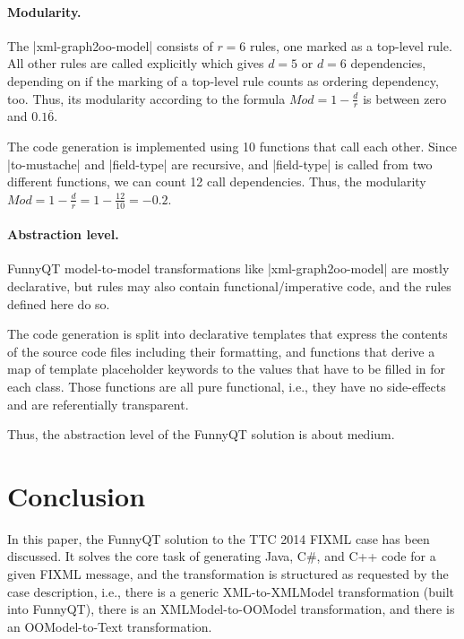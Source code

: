 \documentclass[submission]{eptcs}
\newcommand{\code}{\clojureinline}
\begin{document}
\paragraph{Modularity.}
\label{sec:modularity}

The \code|xml-graph2oo-model| consists of \(r=6\)
rules, one marked as a top-level rule.  All other rules are called explicitly
which gives \(d=5\)
or \(d=6\)
dependencies, depending on if the marking of a top-level rule counts as
ordering dependency, too.  Thus, its modularity according to the formula
\(Mod = 1 - \frac{d}{r}\) is between zero and \(0.1\overline{6}\).

The code generation is implemented using 10 functions that call each other.
Since \code|to-mustache| and \code|field-type| are recursive, and
\code|field-type| is called from two different functions, we can count 12 call
dependencies.  Thus, the modularity
\(Mod = 1 - \frac{d}{r} = 1 - \frac{12}{10} = -0.2\).


\paragraph{Abstraction level.}
\label{sec:abstraction-level}

FunnyQT model-to-model transformations like \code|xml-graph2oo-model| are
mostly declarative, but rules may also contain functional/imperative code, and
the rules defined here do so.

The code generation is split into declarative templates that express the
contents of the source code files including their formatting, and functions
that derive a map of template placeholder keywords to the values that have to
be filled in for each class.  Those functions are all pure functional, i.e.,
they have no side-effects and are referentially transparent.

Thus, the abstraction level of the FunnyQT solution is about medium.


\section{Conclusion}
\label{sec:conclusion}

In this paper, the FunnyQT solution to the TTC 2014 FIXML case has been
discussed.  It solves the core task of generating Java, C\#, and C++ code for a
given FIXML message, and the transformation is structured as requested by the
case description, i.e., there is a generic XML-to-XMLModel transformation
(built into FunnyQT), there is an XMLModel-to-OOModel transformation, and there
is an OOModel-to-Text transformation.
\end{document}
